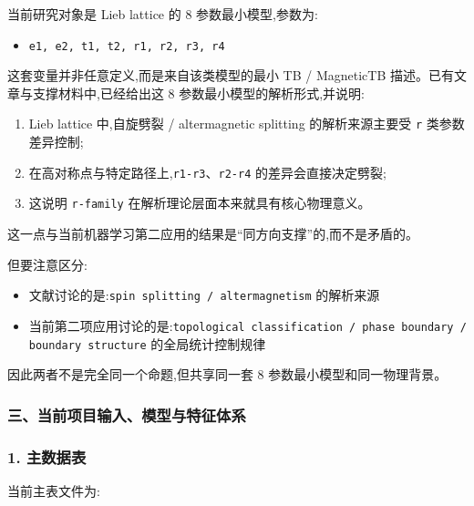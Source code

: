 \documentclass[lang=cn,scheme=chinese,color=blue,device=normal,toc=onecol,math=cm]{elegantbook}
\begin{document}
当前研究对象是 Lieb lattice 的 8 参数最小模型,参数为:\par


\begin{itemize}
\item \texttt{e1, e2, t1, t2, r1, r2, r3, r4}
\end{itemize}


这套变量并非任意定义,而是来自该类模型的最小 TB /\allowbreak{} MagneticTB 描述。已有文章与支撑材料中,已经给出这 8 参数最小模型的解析形式,并说明:\par


\begin{enumerate}
\item Lieb lattice 中,自旋劈裂 /\allowbreak{} altermagnetic splitting 的解析来源主要受 \texttt{r} 类参数差异控制;
\item 在高对称点与特定路径上,\texttt{r1-r3}、\texttt{r2-r4} 的差异会直接决定劈裂;
\item 这说明 \texttt{r-family} 在解析理论层面本来就具有核心物理意义。
\end{enumerate}


这一点与当前机器学习第二应用的结果是“同方向支撑”的,而不是矛盾的。\par


但要注意区分:\par


\begin{itemize}
\item 文献讨论的是:\texttt{spin splitting /\allowbreak{} altermagnetism} 的解析来源
\item 当前第二项应用讨论的是:\texttt{topological classification /\allowbreak{} phase boundary /\allowbreak{} boundary structure} 的全局统计控制规律
\end{itemize}


因此两者不是完全同一个命题,但共享同一套 8 参数最小模型和同一物理背景。\par


\subsubsection{三、当前项目输入、模型与特征体系}


\subsubsection{1. 主数据表}


当前主表文件为:\par
\end{document}
